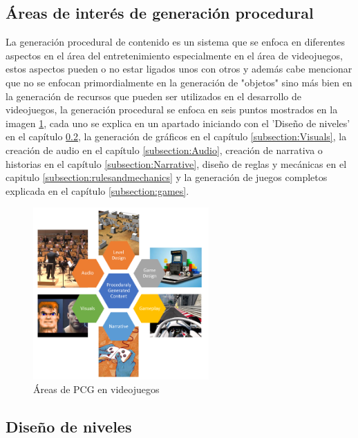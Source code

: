 \subsection{Áreas de interés de generación procedural}
\label{subsection:PCGAreasOfInterest}

La generación procedural de contenido es un sistema que se enfoca en diferentes
aspectos en el área del entretenimiento especialmente en el área de videojuegos,
estos aspectos pueden o no estar ligados unos con otros y además cabe mencionar
que no se enfocan primordialmente en la generación de "objetos" sino más bien en
la generación de recursos que pueden ser utilizados en el desarrollo de
videojuegos, la generación procedural se enfoca en seis puntos mostrados en la
imagen \ref{figure:pcg_areas}, cada uno se explica en un apartado iniciando con
el 'Diseño de niveles' en el capítulo \ref{subsection:LevelDesign}, la
generación de gráficos en el capítulo \ref{subsection:Visuals}, la creación de
audio en el capítulo \ref{subsection:Audio}, creación de narrativa o historias
en el capítulo \ref{subsection:Narrative}, diseño de reglas y mecánicas en el
capitulo \ref{subsection:rulesandmechanics} y la generación de juegos completos
explicada en el capítulo \ref{subsection:games}.

\begin{figure}
    \centering
    \includegraphics[width=0.6\textwidth]{img/pcg_areas.png}
    \caption{Áreas de PCG en videojuegos}
    \label{figure:pcg_areas}
\end{figure}

\subsection{Diseño de niveles}
\label{subsection:LevelDesign}

